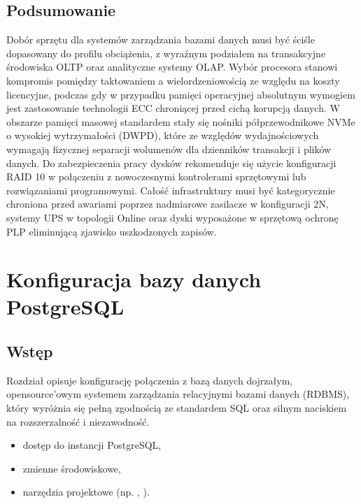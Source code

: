 \documentclass[a4paper,11pt,english,openany,oneside]{sphinxmanual}
\begin{document}
\subsection{Podsumowanie}
\label{\detokenize{rozdzial_2/rozdzial_21/index:podsumowanie}}
\sphinxAtStartPar
Dobór sprzętu dla systemów zarządzania bazami danych musi być ściśle dopasowany do profilu obciążenia, z wyraźnym podziałem na transakcyjne środowiska OLTP oraz analityczne systemy OLAP. Wybór procesora stanowi kompromis pomiędzy taktowaniem a wielordzeniowością ze względu na koszty licencyjne, podczas gdy w przypadku pamięci operacyjnej absolutnym wymogiem jest zastosowanie technologii ECC chroniącej przed cichą korupcją danych. W obszarze pamięci masowej standardem stały się nośniki półprzewodnikowe NVMe o wysokiej wytrzymałości (DWPD), które ze względów wydajnościowych wymagają fizycznej separacji wolumenów dla dzienników transakcji i plików danych. Do zabezpieczenia pracy dysków rekomenduje się użycie konfiguracji RAID 10 w połączeniu z nowoczesnymi kontrolerami sprzętowymi lub rozwiązaniami programowymi. Całość infrastruktury musi być kategorycznie chroniona przed awariami poprzez nadmiarowe zasilacze w konfiguracji 2N, systemy UPS w topologii Online oraz dyski wyposażone w sprzętową ochronę PLP eliminującą zjawisko uszkodzonych zapisów.

\sphinxstepscope


\section{Konfiguracja bazy danych PostgreSQL}
\label{\detokenize{rozdzial_2/rozdzial_22/index:konfiguracja-bazy-danych-postgresql}}\label{\detokenize{rozdzial_2/rozdzial_22/index::doc}}

\subsection{Wstęp}
\label{\detokenize{rozdzial_2/rozdzial_22/index:wstep}}
\sphinxAtStartPar
Rozdział opisuje konfigurację połączenia z bazą danych  \textendash{} dojrzałym, open\sphinxhyphen{}source’owym systemem zarządzania relacyjnymi bazami danych (RDBMS), który wyróżnia się pełną zgodnością ze standardem SQL oraz silnym naciskiem na rozszerzalność i niezawodność.

\sphinxAtStartPar
{}
\begin{itemize}
\item {} 
\sphinxAtStartPar
dostęp do instancji PostgreSQL,

\item {} 
\sphinxAtStartPar
zmienne środowiskowe,

\item {} 
\sphinxAtStartPar
narzędzia projektowe (np. , ).

\end{itemize}
\end{document}
